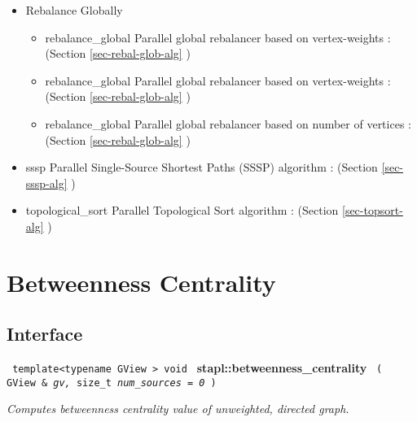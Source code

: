 \begin{itemize}
\item
Rebalance Globally
\begin{itemize}
\item
rebalance\_global
\newline
Parallel global rebalancer based on vertex-weights
 : (Section \ref{sec-rebal-glob-alg} )
\item
rebalance\_global
\newline
Parallel global rebalancer based on vertex-weights
 : (Section \ref{sec-rebal-glob-alg} )
\item
rebalance\_global
\newline
Parallel global rebalancer based on number of vertices
 : (Section \ref{sec-rebal-glob-alg} )
\end{itemize}

\item
sssp 
\newline
Parallel Single-Source Shortest Paths (SSSP) algorithm
 : (Section \ref{sec-sssp-alg} )

\item
topological\_sort
\newline
Parallel Topological Sort algorithm
 : (Section \ref{sec-topsort-alg} )
\end{itemize}


\section{ Betweenness Centrality} 
\label{sec-betw-cent-alg}

\subsection{Interface} \label{sec-betw-cent-alg-inter}

\noindent
\texttt{%
template<typename GView >
\newline
void 
}
\newline
\textbf{stapl::betweenness\_centrality}%
\newline
\texttt{%
(
GView \&
\textit{gv,}%
size\_t
\textit{num\_sources = 0}%
)     
}
\vspace{0.4cm}

\textit{
Computes betweenness centrality value of unweighted, directed graph.
}
\vspace{0.4cm}

